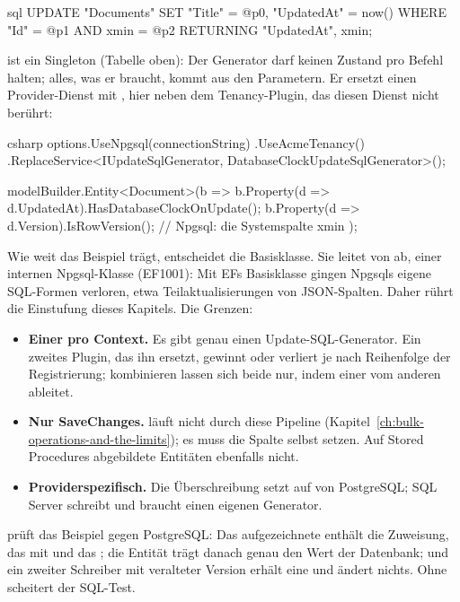 \begin{sourcecode}{sql}
UPDATE "Documents" SET "Title" = @p0, "UpdatedAt" = now()
WHERE "Id" = @p1 AND xmin = @p2
RETURNING "UpdatedAt", xmin;
\end{sourcecode}

 ist ein Singleton (Tabelle oben): Der
Generator darf keinen Zustand pro Befehl halten; alles, was er braucht, kommt aus den
Parametern. Er ersetzt einen Provider-Dienst mit , hier neben
dem Tenancy-Plugin, das diesen Dienst nicht berührt:

\begin{sourcecode}[Registrierung]{csharp}
options.UseNpgsql(connectionString)
    .UseAcmeTenancy()
    .ReplaceService<IUpdateSqlGenerator, DatabaseClockUpdateSqlGenerator>();

modelBuilder.Entity<Document>(b =>
{
    b.Property(d => d.UpdatedAt).HasDatabaseClockOnUpdate();
    b.Property(d => d.Version).IsRowVersion();            // Npgsql: die Systemspalte xmin
});
\end{sourcecode}

Wie weit das Beispiel trägt, entscheidet die Basisklasse. Sie leitet von
 ab, einer internen
Npgsql-Klasse (EF1001): Mit EFs Basisklasse gingen Npgsqls eigene SQL-Formen verloren, etwa
Teilaktualisierungen von JSON-Spalten. Daher rührt die Einstufung dieses Kapitels. Die Grenzen:

\begin{itemize}
  \item \textbf{Einer pro Context.} Es gibt genau einen Update-SQL-Generator. Ein zweites
    Plugin, das ihn ersetzt, gewinnt oder verliert je nach Reihenfolge der Registrierung;
    kombinieren lassen sich beide nur, indem einer vom anderen ableitet.
  \item \textbf{Nur SaveChanges.}  läuft nicht durch diese
    Pipeline (Kapitel~\ref{ch:bulk-operations-and-the-limits}); es muss die Spalte selbst
    setzen. Auf Stored Procedures abgebildete Entitäten ebenfalls nicht.
  \item \textbf{Providerspezifisch.} Die Überschreibung setzt auf  von
    PostgreSQL; SQL Server schreibt  und braucht einen eigenen Generator.
\end{itemize}

 prüft das Beispiel gegen PostgreSQL: Das
aufgezeichnete  enthält die Zuweisung, das  mit  und das
; die Entität trägt danach genau den Wert der Datenbank; und ein zweiter
Schreiber mit veralteter Version erhält eine
 und ändert nichts.
Ohne  scheitert der SQL-Test.

